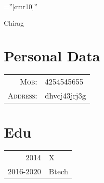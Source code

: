 \documentclass[a4paper,10pt]{article}
\begin{document}
\pagestyle{empty}
\font\fb=''[cmr10]''
\par{\centering
		{\Huge Chirag
	}\bigskip\par}
\section{Personal Data}
\begin{tabular}{rl}
\textsc{Mob:}&4254545655\\
\textsc{Address:}&dhvcj43jrj3g\\
\end{tabular}
\section{Edu}
\begin{tabular}{rl}
\textsc{2014}&X\\
\textsc{2016-2020}&Btech\\
\end{tabular}
\end{document}
